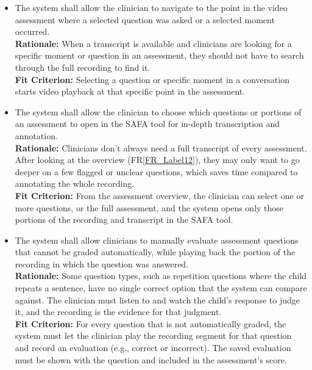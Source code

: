 \documentclass[12pt]{article}
\newcounter{reqnum} %
\newcommand{\rthereqnum}{FR\thereqnum}
\newcommand{\rref}[1]{FR\ref{#1}}
\begin{document}
\begin{itemize}
\item[\textbf{\rthereqnum} \label{FR_Label14}:] The system shall allow the clinician to navigate to the point in the video assessment where a selected question was asked or a selected moment occurred.
\\ \textbf{Rationale:} When a transcript is available and clinicians are looking for a specific moment or question in an assessment, they should not have to search through the full recording to find it.
\\ \textbf{Fit Criterion:} Selecting a question or specific moment in a conversation starts video playback at that specific point in the assessment.

\item[\textbf{\rthereqnum} \label{FR_Label15}:] The system shall allow the clinician to choose which questions or portions of an assessment to open in the SAFA tool for in-depth transcription and annotation.
\\ \textbf{Rationale:} Clinicians don't always need a full transcript of every assessment. After looking at the overview (\rref{FR_Label12}), they may only want to go deeper on a few flagged or unclear questions, which saves time compared to annotating the whole recording.
\\ \textbf{Fit Criterion:} From the assessment overview, the clinician can select one or more questions, or the full assessment, and the system opens only those portions of the recording and transcript in the SAFA tool.

\item[\textbf{\rthereqnum} \label{FR_ManualEvaluation}:] The system shall allow clinicians to manually evaluate assessment questions that cannot be graded automatically, while playing back the portion of the recording in which the question was answered.
\\ \textbf{Rationale:} Some question types, such as repetition questions where the child repeats a sentence, have no single correct option that the system can compare against. The clinician must listen to and watch the child’s response to judge it, and the recording is the evidence for that judgment.
\\ \textbf{Fit Criterion:} For every question that is not automatically graded, the system must let the clinician play the recording segment for that question and record an evaluation (e.g., correct or incorrect). The saved evaluation must be shown with the question and included in the assessment’s score.


\end{itemize}
\end{document}
